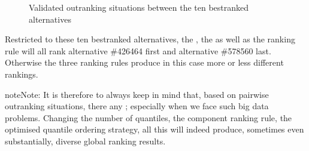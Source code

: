\documentclass[a4paper,12pt,english]{sphinxhowto}
\let\sphinxpxdimen\pdfpxdimen\else\newdimen\sphinxpxdimen
\begin{document}
\begin{figure}[H]
\centering
\capstart

\noindent\sphinxincludegraphics[width=400\sphinxpxdimen]{{converse-dual_rel_best10}.png}
\caption{Validated  outranking situations between the ten best\sphinxhyphen{}ranked alternatives}\label{\detokenize{tutorial:converse-dual-rel-best10}}\end{figure}

Restricted to these ten best\sphinxhyphen{}ranked alternatives, the , the  as well as the  ranking rule will all rank alternative \#426464 first and alternative \#578560 last. Otherwise the three ranking rules produce in this case more or less different rankings.

\begin{sphinxVerbatim}[commandchars=\\\{\},numbers=left,firstnumber=1,stepnumber=1]
   
  
\end{sphinxVerbatim}

\begin{sphinxadmonition}{note}{Note:}
It is therefore  to always keep in mind that, based on pairwise outranking situations, there  any ; especially when we face such big data problems. Changing the number of quantiles, the component ranking rule, the optimised quantile ordering strategy, all this will indeed produce, sometimes even substantially, diverse global ranking results.
\end{sphinxadmonition}
\end{document}
